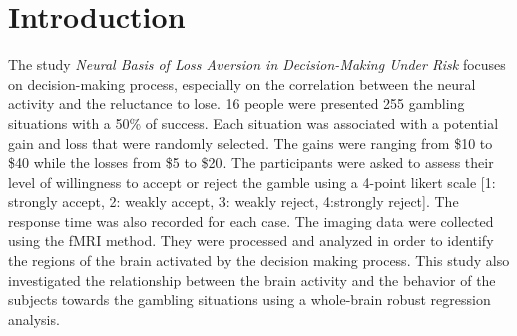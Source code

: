 \section{Introduction}

The study \textit{Neural Basis of Loss Aversion in Decision-Making Under Risk} 
\cite{tom2007neural} focuses on decision-making process, especially on the 
correlation between the neural activity and the reluctance to lose. 16 people
were presented 255 gambling situations with a 50\% of success. Each situation
was associated with a potential gain and loss that were randomly selected.
The gains were ranging from \$10 to \$40 while the losses from \$5 to \$20.
The participants were asked to assess their level of willingness to accept or 
reject the gamble using a 4-point likert scale [1: strongly accept,
2: weakly accept, 3: weakly reject, 4:strongly reject]. The response time was
also recorded for each case.
The imaging data were collected using the fMRI method. They were processed 
and analyzed in order to identify the regions of the brain activated by the
decision making process. This study also investigated the relationship between 
the brain activity and the behavior of the subjects towards the gambling
situations using a whole-brain robust regression analysis.
